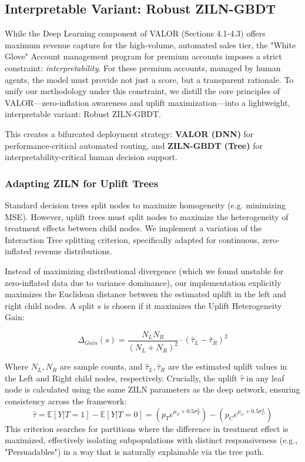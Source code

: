 \documentclass[runningheads]{llncs}
\begin{document}
\subsection{Interpretable Variant: Robust ZILN-GBDT}
While the Deep Learning component of VALOR (Sections 4.1-4.3) offers maximum revenue capture for the high-volume, automated sales tier, the "White Glove" Account management program for premium accounts imposes a strict constraint: \textit{interpretability}. For these premium accounts, managed by human agents, the model must provide not just a score, but a transparent rationale. To unify our methodology under this constraint, we distill the core principles of VALOR—zero-inflation awareness and uplift maximization—into a lightweight, interpretable variant: Robust ZILN-GBDT.

This creates a bifurcated deployment strategy: \textbf{VALOR (DNN)} for performance-critical automated routing, and \textbf{ZILN-GBDT (Tree)} for interpretability-critical human decision support.

\subsubsection{Adapting ZILN for Uplift Trees}
Standard decision trees split nodes to maximize homogeneity (e.g. minimizing MSE). However, uplift trees must split nodes to maximize the heterogeneity of treatment effects between child nodes. We implement a variation of the Interaction Tree splitting criterion, specifically adapted for continuous, zero-inflated revenue distributions.

Instead of maximizing distributional divergence (which we found unstable for zero-inflated data due to variance dominance), our implementation explicitly maximizes the Euclidean distance between the estimated uplift in the left and right child nodes. A split $s$ is chosen if it maximizes the Uplift Heterogeneity Gain:

\begin{equation}
    \Delta_{Gain}(s) = \frac{N_L N_R}{(N_L + N_R)^2} \cdot \left( \hat{\tau}_L - \hat{\tau}_R \right)^2
\end{equation}

Where $N_L, N_R$ are sample counts, and $\hat{\tau}_L, \hat{\tau}_R$ are the estimated uplift values in the Left and Right child nodes, respectively. Crucially, the uplift $\hat{\tau}$ in any leaf node is calculated using the same ZILN parameters as the deep network, ensuring consistency across the framework:
\begin{equation}
    \hat{\tau} = \mathbb{E}[Y|T=1] - \mathbb{E}[Y|T=0] = \left( p_T e^{\mu_T + 0.5\sigma_T^2} \right) - \left( p_C e^{\mu_C + 0.5\sigma_C^2} \right)
\end{equation}
This criterion searches for partitions where the difference in treatment effect is maximized, effectively isolating subpopulations with distinct responsiveness (e.g., "Persuadables") in a way that is naturally explainable via the tree path.
\end{document}
